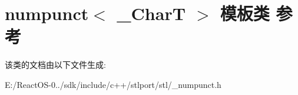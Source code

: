 \hypertarget{classnumpunct}{}\section{numpunct$<$ \+\_\+\+CharT $>$ 模板类 参考}
\label{classnumpunct}


该类的文档由以下文件生成\+:\begin{DoxyCompactItemize}
\item 
E\+:/\+React\+O\+S-\/0../sdk/include/c++/stlport/stl/\+\_\+numpunct.\+h\end{DoxyCompactItemize}
